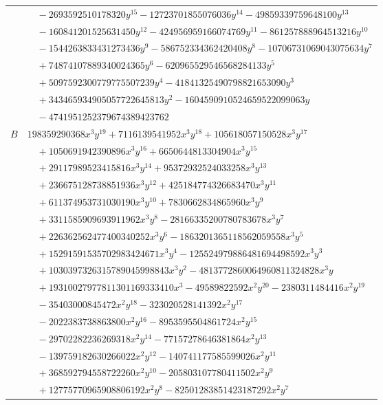 \documentclass[11pt]{article}
\begin{document}
\begin{longtable}{@{}ll@{}}
 & $\quad -2693592510178320y^{15}-12723701855076036y^{14}-49859339759648100y^{13}$\\
 & $\quad -160841201525631450y^{12}-424956959166074769y^{11}-861257888964513216y^{10}$\\
 & $\quad -1544263833431273436y^{9}-586752334362420408y^{8}-10706731069043075634y^{7}$\\
 & $\quad +74874107889340024365y^{6}-620965529546568284133y^{5}$\\
 & $\quad +5097592300779775507239y^{4}-41841325490798821653090y^{3}$\\
 & $\quad +343465934905057722645813y^{2}-1604590910524659522099063y$\\
 & $\quad -4741951252379674389423762$\\
$B$ & $198359290368x^{3}y^{19}+7116139541952x^{3}y^{18}+105618057150528x^{3}y^{17}$\\
 & $\quad +1050691942390896x^{3}y^{16}+6650644813304904x^{3}y^{15}$\\
 & $\quad +29117989523415816x^{3}y^{14}+95372932524033258x^{3}y^{13}$\\
 & $\quad +236675128738851936x^{3}y^{12}+425184774326683470x^{3}y^{11}$\\
 & $\quad +611374953731030190x^{3}y^{10}+7830662834865960x^{3}y^{9}$\\
 & $\quad +3311585909693911962x^{3}y^{8}-28166335200780783678x^{3}y^{7}$\\
 & $\quad +226362562477400340252x^{3}y^{6}-1863201365118562059558x^{3}y^{5}$\\
 & $\quad +15291591535702983424671x^{3}y^{4}-125524979886481694498592x^{3}y^{3}$\\
 & $\quad +1030397326315789045998843x^{3}y^{2}-4813772860064960811324828x^{3}y$\\
 & $\quad +19310027977811301169333410x^{3}-49589822592x^{2}y^{20}-2380311484416x^{2}y^{19}$\\
 & $\quad -35403000845472x^{2}y^{18}-323020528141392x^{2}y^{17}$\\
 & $\quad -2022383738863800x^{2}y^{16}-8953595504861724x^{2}y^{15}$\\
 & $\quad -29702282236269318x^{2}y^{14}-77157278646381864x^{2}y^{13}$\\
 & $\quad -139759182630266022x^{2}y^{12}-140741177585599026x^{2}y^{11}$\\
 & $\quad +368592794558722260x^{2}y^{10}-205803107780411502x^{2}y^{9}$\\
 & $\quad +12775770965908806192x^{2}y^{8}-82501283851423187292x^{2}y^{7}$\\

\end{longtable}
\end{document}
